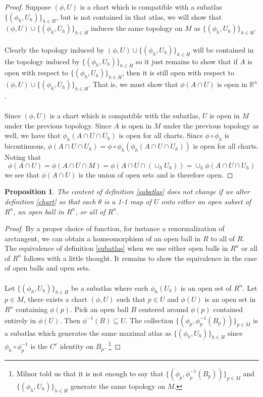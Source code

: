 \documentclass{article}
\theoremstyle{problemstyle}
\theoremstyle{problemstyle}
\theoremstyle{problemstyle}
\theoremstyle{problemstyle}
\newtheorem{proposition}{Proposition}
\theoremstyle{problemstyle}
\theoremstyle{problemstyle}
\begin{document}
\begin{proof}
Suppose $(\phi,U)$ is a chart which is compatible with a subatlas $\{(\phi_h,U_h)\}_{h \in H}$, but is not contained in that atlas, we will show that $(\phi,U) \cup \{(\phi_h,U_h)\}_{h \in H}$ induces the same topology on $M$ as $\{(\phi_h,U_h)\}_{h \in H}$.\\\\
Clearly the topology induced by $(\phi,U) \cup \{(\phi_h,U_h)\}_{h \in H}$ will be contained in the topology induced by $\{(\phi_h,U_h)\}_{h \in H}$ so it just remains to show that if $A$ is open with respect to $\{(\phi_h,U_h)\}_{h \in H}$, then it is still open with respect to $(\phi,U) \cup \{(\phi_h,U_h)\}_{h \in H}$. That is, we must show that $\phi(A \cap U)$ is open in $\mathbb{R}^n$.\\\\
Since $(\phi,U)$ is a chart which is compatible with the subatlas, $U$ is open in $M$ under the previous topology. Since $A$ is open in $M$ under the previous topology as well, we have that $\phi_h(A \cap U \cap U_h)$ is open for all charts. Since $\phi\circ\phi_h$ is bicontinuous, $\phi(A \cap U \cap U_h) = \phi\circ\phi_h(\phi_h(A \cap U \cap U_h))$ is open for all charts. Noting that $$\phi(A \cap U) = \phi(A \cap U \cap M) = \phi(A \cap U \cap (\cup_hU_h)) = \cup_h\phi(A \cap U \cap U_h)$$ we see that $\phi(A \cap U)$ is the union of open sets and is therefore open.  
\end{proof}

\begin{proposition}
The content of definition \ref{subatlas} does not change if we alter definition \ref{chart} so that each $\theta$ is a 1-1 map of $U$ onto either an open subset of $R^n$, an open ball in $R^n$, or all of $R^n$. \cite{Spivak99}
\end{proposition}

\begin{proof}
By a proper choice of function, for instance a renormalization of arctangent, we can obtain a homeomorphism of an open ball in $R$ to all of $R$. The equivalence of definition \ref{subatlas} when we use either open balls in $R^n$ or all of $R^n$ follows with a little thought. It remains to show the equivalence in the case of open balls and open sets.\\\\ 
Let $\{(\phi_h,U_h)\}_{h \in H}$ be a subatlas where each $\phi_h(U_h)$ is an open set of $R^n$. Let $p \in M$, there exists a chart $(\phi,U)$ such that $p \in U$ and $\phi(U)$ is an open set in $R^n$ containing $\phi(p)$. Pick an open ball $B$ centered around $\phi(p)$ contained entirely in $\phi(U)$. Then $\phi^{-1}(B) \subseteq U$. The collection $\{(\phi_p,\phi_p^{-1}(B_p))\}_{p \in M}$ is a subatlas which generates the same maximal atlas as $\{(\phi_h,U_h)\}_{h \in H}$ since $\phi_h\circ \phi_p^{-1}$ is the $C^r$ identity on $B_p$. \footnote{Milnor told us that it is not enough to say that $\{(\phi_p,\phi_p^{-1}(B_p))\}_{p \in M}$ and $\{(\phi_h,U_h)\}_{h \in H}$ generate the same topology on $M$.}
\end{proof}
\end{document}

